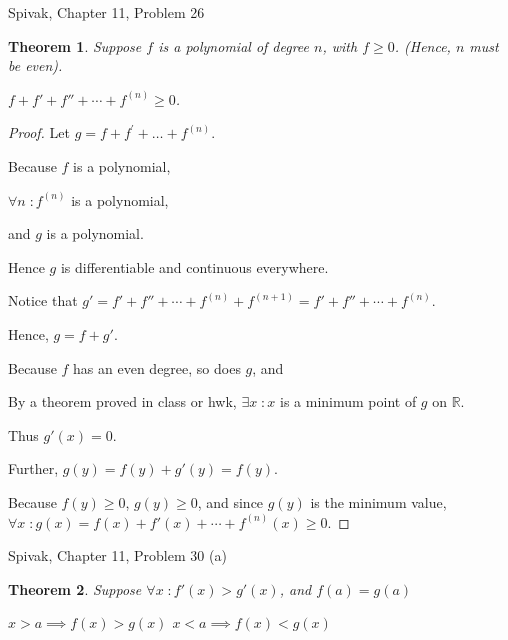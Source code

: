 \documentclass{article} %
\theoremstyle{plain}
\newtheorem*{theorem*}{Theorem}
\theoremstyle{definition}
\begin{document}
\noindent{} Spivak, Chapter 11, Problem 26 

\begin{theorem*}
    Suppose $f$ is a polynomial of degree $n$, with $f \geq 0$. (Hence, $n$ must be even).

    $f + f' + f'' + \cdots + f^{(n)} \geq 0$.
\end{theorem*}

\begin{proof} 
    Let $g = f + f^\prime + \dots + f^{(n)}$.
    
    Because $f$ is a polynomial,

    $\forall n \; \colon f^{(n)}$ is a polynomial,

    and $g$ is a polynomial.

    Hence $g$ is differentiable and continuous everywhere.

    Notice that $g' = f' + f'' + \cdots + f^{(n)} + f^{(n+1)} = f' + f'' + \cdots + f^{(n)}$.

    Hence, $g = f + g'$.

    Because $f$ has an even degree, so does $g$, and

    By a theorem proved in class or hwk, $\exists x \; \colon x$ is a minimum point of $g$ on $\mathbb{R}$.

    Thus $g'(x) = 0$.

    Further, $g(y) = f(y) + g'(y) = f(y)$.

    Because $f(y) \geq 0$, $g(y) \geq 0$, and since $g(y)$ is the minimum value, $\forall x \; \colon g(x) = f(x) + f'(x) + \cdots + f^{(n)}(x) \geq 0$.
\end{proof}

\noindent{} Spivak, Chapter 11, Problem 30 (a) 

\begin{theorem*}
    Suppose $\forall x \; \colon f'(x) > g'(x)$, and $f(a) = g(a)$

    $x > a \implies f(x) > g(x)$
    $x < a \implies f(x) < g(x)$
\end{theorem*}
\end{document}
